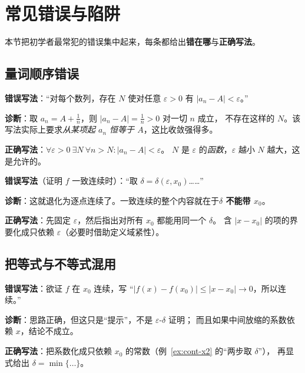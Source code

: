 \documentclass[11pt,a4paper]{ctexart}
\theoremstyle{definition}
\theoremstyle{remark}
\newcommand{\eps}{\varepsilon}
\newcommand{\abs}[1]{\left\lvert #1 \right\rvert}
\begin{document}
\newpage

\section{常见错误与陷阱}

本节把初学者最常犯的错误集中起来，每条都给出\textbf{错在哪}与\textbf{正确写法}。

\subsection{量词顺序错误}

\begin{warnbox}[错误 1：把 $\forall\eps\exists N$ 写成 $\exists N\forall\eps$]
\textbf{错误写法}：“对每个数列，存在 $N$ 使对任意 $\eps>0$ 有 $\abs{a_n-A}<\eps$。”
\par\smallskip
\textbf{诊断}：取 $a_n=A+\frac1n$，则 $\abs{a_n-A}=\frac1n>0$ 对一切 $n$ 成立，
不存在这样的 $N$。该写法实际上要求\emph{从某项起 $a_n$ 恒等于 $A$}，这比收敛强得多。
\par\smallskip
\textbf{正确写法}：$\forall\eps>0\ \exists N\ \forall n>N:\abs{a_n-A}<\eps$。
$N$ 是 $\eps$ 的\emph{函数}，$\eps$ 越小 $N$ 越大，这是允许的。
\end{warnbox}

\begin{warnbox}
\textbf{错误写法}（证明 $f$ 一致连续时）：“取 $\delta=\delta(\eps,x_0)$……”
\par\smallskip
\textbf{诊断}：这就退化为逐点连续了。一致连续的整个内容就在于\textbf{$\delta$ 不能带 $x_0$}。
\par\smallskip
\textbf{正确写法}：先固定 $\eps$，然后指出对所有 $x_0$ 都能用同一个 $\delta$。
含 $\abs{x-x_0}$ 的项的界要化成只依赖 $\eps$（必要时借助定义域紧性）。
\end{warnbox}

\subsection{把等式与不等式混用}

\begin{warnbox}
\textbf{错误写法}：欲证 $f$ 在 $x_0$ 连续，写
“$\abs{f(x)-f(x_0)}\le \abs{x-x_0}\to0$，所以连续。”
\par\smallskip
\textbf{诊断}：思路正确，但这只是“提示”，不是 $\eps$-$\delta$ 证明；
而且如果中间放缩的系数依赖 $x$，结论不成立。
\par\smallskip
\textbf{正确写法}：把系数化成只依赖 $x_0$ 的常数（例~\ref{ex:cont-x2} 的“两步取 $\delta$”），
再显式给出 $\delta=\min\{\dots\}$。
\end{warnbox}
\end{document}
